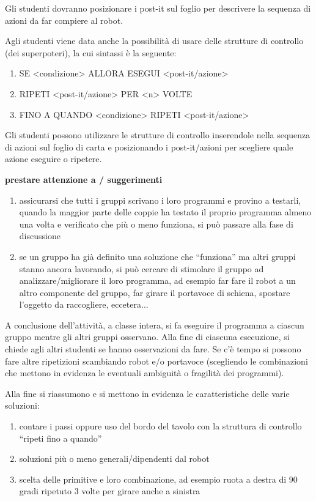 \documentclass[12pt]{article}
\begin{document}
Gli studenti dovranno posizionare i post-it sul foglio per descrivere la sequenza di azioni da far compiere al robot.

Agli studenti viene data anche la possibilità di usare delle strutture di controllo (dei superpoteri), la cui sintassi è la seguente:
\begin{enumerate}
\item SE <condizione> ALLORA ESEGUI <post-it/azione>
\item RIPETI <post-it/azione> PER <n> VOLTE
\item FINO A QUANDO <condizione> RIPETI <post-it/azione>
\end{enumerate}

Gli studenti possono utilizzare le strutture di controllo inserendole nella sequenza di azioni sul foglio di carta e posizionando i post-it/azioni per scegliere quale azione eseguire o ripetere.


\textbf{prestare attenzione a / suggerimenti}
\begin{enumerate}
\item assicurarsi che tutti i gruppi scrivano i loro programmi e provino a testarli, quando la maggior parte delle coppie ha testato il proprio programma almeno una volta e verificato che più o meno funziona, si può passare alla fase di discussione
\item se un gruppo ha già definito una soluzione che “funziona” ma altri gruppi stanno ancora lavorando, si può cercare di stimolare il gruppo ad analizzare/migliorare il loro programma, ad esempio far fare il robot a un altro componente del gruppo, far girare il portavoce di schiena, spostare l’oggetto da raccogliere, eccetera...
\end{enumerate}

A conclusione dell’attività, a classe intera, si fa eseguire il programma a ciascun gruppo mentre gli altri gruppi osservano. Alla fine di ciascuna esecuzione, si chiede agli altri studenti se hanno osservazioni da fare. Se c’è tempo si possono fare altre ripetizioni scambiando robot e/o portavoce (scegliendo le combinazioni che mettono in evidenza le eventuali ambiguità o fragilità dei programmi).

Alla fine si riassumono e si mettono in evidenza le caratteristiche delle varie soluzioni:
\begin{enumerate}
\item contare i passi oppure uso del bordo del tavolo con la struttura di controllo “ripeti fino a quando”
\item soluzioni più o meno generali/dipendenti dal robot
\item scelta delle primitive e loro combinazione,  ad esempio ruota a destra di 90 gradi ripetuto 3 volte per girare anche a sinistra
\end{enumerate}
\end{document}
